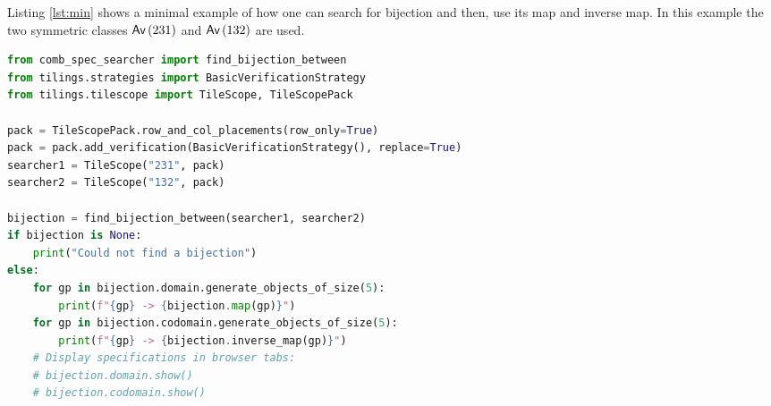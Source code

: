 \label{ch:minex}
Listing \ref{lst:min} shows a minimal example of how one can search for bijection and then, use its map and inverse map. In this example the two symmetric classes $\textsf{Av}\left(231\right)$ and $\textsf{Av}\left(132\right)$ are used.

\begin{lstlisting}[style=py,language=Python,caption={A minimal example to find a bijection.},label={lst:min}]
from comb_spec_searcher import find_bijection_between
from tilings.strategies import BasicVerificationStrategy
from tilings.tilescope import TileScope, TileScopePack

pack = TileScopePack.row_and_col_placements(row_only=True)
pack = pack.add_verification(BasicVerificationStrategy(), replace=True)
searcher1 = TileScope("231", pack)
searcher2 = TileScope("132", pack)

bijection = find_bijection_between(searcher1, searcher2)
if bijection is None:
    print("Could not find a bijection")
else:
    for gp in bijection.domain.generate_objects_of_size(5):
        print(f"{gp} -> {bijection.map(gp)}")
    for gp in bijection.codomain.generate_objects_of_size(5):
        print(f"{gp} -> {bijection.inverse_map(gp)}")
    # Display specifications in browser tabs:
    # bijection.domain.show()
    # bijection.codomain.show()
\end{lstlisting}